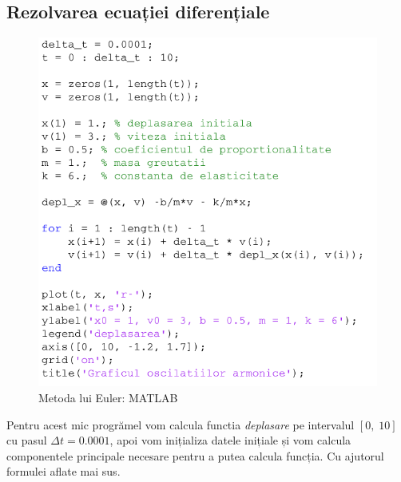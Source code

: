 \documentclass[12pt, a4paper]{article}
\begin{document}
\subsection{Rezolvarea ecuației diferențiale}
\begin{figure}[h]
    \centering
    \includegraphics[width=\linewidth, height=\textheight, keepaspectratio]{euler_met}
    \caption{Metoda lui Euler: MATLAB}
    \label{fig:euler}
\end{figure}
Pentru acest mic progrămel vom calcula functia \emph{deplasare} pe intervalul $[0,\;10]$ cu pasul $\Delta t = 0.0001$, apoi vom inițializa datele inițiale și vom calcula componentele principale necesare pentru a putea calcula funcția. Cu ajutorul formulei aflate mai sus.
\newpage
\end{document}
